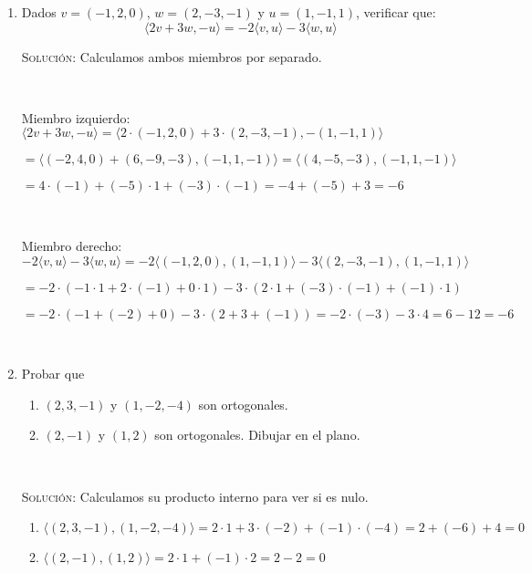 \documentclass[a4paper,12pt,twoside,spanish,reqno]{amsbook}
\numberwithin{equation}{section}
\newcommand{\rta}{\noindent\textsc{Solución: }}
\begin{document}
\begin{enumerate}
\

\item Dados $v = (-1, 2,0)$, $w = (2,-3,-1)$  y $u = (1,-1,1)$, verificar que:
\begin{equation*}
	\langle 2v + 3w , -u   \rangle = -2\langle v ,u \rangle -3 \langle w , u  \rangle
\end{equation*}

\rta Calculamos ambos miembros por separado.

\

Miembro izquierdo: $\langle 2v + 3w , -u   \rangle = \langle 2 \cdot (-1, 2,0) + 3 \cdot (2,-3,-1) , -  (1,-1,1) \rangle $

$= \langle (-2, 4,0) + (6,-9,-3) , (-1,1,-1) \rangle = \langle (4,-5,-3) , (-1,1,-1) \rangle $

$= 4 \cdot (-1) + (-5) \cdot 1 + (-3) \cdot (-1) = -4 + (-5) + 3 = \boxed{-6}$

\

Miembro derecho: $-2\langle v ,u \rangle -3 \langle w , u  \rangle = -2 \langle (-1, 2,0) ,(1,-1,1) \rangle -3 \langle (2,-3,-1) , (1,-1,1)  \rangle $

$= -2 \cdot ( -1 \cdot 1 + 2 \cdot (-1) + 0 \cdot 1 ) - 3 \cdot ( 2 \cdot 1 + (-3) \cdot (-1) + (-1) \cdot 1 ) $

$= -2 \cdot ( -1 + (-2) + 0) - 3 \cdot ( 2 + 3 + (-1)) = -2 \cdot (-3) - 3 \cdot  4 = 6 - 12 = \boxed{-6} $

\

\item Probar  que 
\begin{enumerate}
	\item $(2,3,-1)$ y $(1, -2, -4)$ son ortogonales.
	\item $(2,-1)$ y $(1,2)$ son ortogonales. Dibujar en el plano. 
\end{enumerate}

\ 

\rta Calculamos su producto interno para ver si es nulo.

\begin{enumerate}
	\item $ \langle (2,3,-1) , (1, -2, -4) \rangle = 2 \cdot 1 + 3 \cdot (-2) + (-1) \cdot (-4) = 2 + (-6) + 4 = \boxed{0} $
	
	\item $ \langle (2,-1) , (1,2) \rangle = 2 \cdot 1 + (-1) \cdot 2 = 2 - 2 = \boxed{0}$
	
\end{enumerate}


\end{enumerate}
\end{document}

